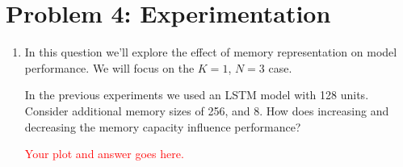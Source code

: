 \documentclass[12pt]{article}
\begin{document}
\section*{Problem 4: Experimentation}
\begin{enumerate}[label=\alph*]
    
    \item In this question we'll explore the effect of memory representation on model performance. We will focus on the $K=1$, $N=3$ case.
    
    In the previous experiments we used an LSTM model with 128 units. Consider additional memory sizes of 256, and 8. How does increasing and decreasing the memory capacity influence performance?
    
    \textcolor{red}{Your plot and answer goes here.}



\end{enumerate}
\end{document}
